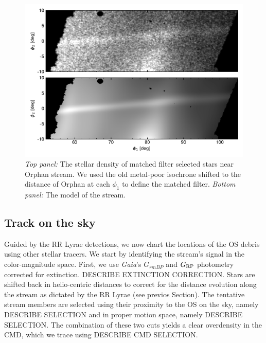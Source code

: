 \documentclass[a4paper,useAMS,usenatbib]{mnras}
\newcommand{\Gaia}{{\it Gaia}}
\begin{document}
%
\begin{figure}
\includegraphics{decals_map.pdf}
\caption{{\it Top panel:} The stellar density of matched filter
  selected stars near Orphan stream. We used the old metal-poor
  isochrone shifted to the distance of Orphan at each $\phi_1$ to
  define the matched filter. {\it Bottom panel:} The model of the
  stream.}
\label{fig:decals_track}
\end{figure}
%

\subsection{Track on the sky}

Guided by the RR Lyrae detections, we now chart the locations of the
OS debris using other stellar tracers. We start by identifying the
stream's signal in the color-magnitude space. First, we use \Gaia's
$G_{rm BP}$ and $G_{\rm RP}$ photometry corrected for
extinction. DESCRIBE EXTINCTION CORRECTION. Stars are shifted back in
helio-centric distances to correct for the distance evolution along
the stream as dictated by the RR Lyrae (see previos Section). The
tentative stream members are selected using their proximity to the OS
on the sky, namely DESCRIBE SELECTION and in proper motion space,
namely DESCRIBE SELECTION. The combination of these two cuts yields a
clear overdensity in the CMD, which we trace using DESCRIBE CMD
SELECTION. 
\end{document}
